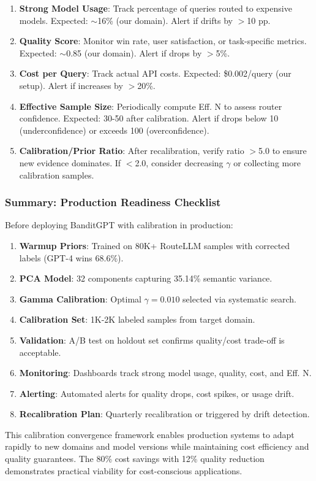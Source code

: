 \begin{enumerate}
    \item \textbf{Strong Model Usage}: Track percentage of queries routed to expensive models. Expected: $\sim$16\% (our domain). Alert if drifts by $>$10 pp.
    
    \item \textbf{Quality Score}: Monitor win rate, user satisfaction, or task-specific metrics. Expected: $\sim$0.85 (our domain). Alert if drops by $>$5\%.
    
    \item \textbf{Cost per Query}: Track actual API costs. Expected: \$0.002/query (our setup). Alert if increases by $>$20\%.
    
    \item \textbf{Effective Sample Size}: Periodically compute Eff. N to assess router confidence. Expected: 30-50 after calibration. Alert if drops below 10 (underconfidence) or exceeds 100 (overconfidence).
    
    \item \textbf{Calibration/Prior Ratio}: After recalibration, verify ratio $>$5.0 to ensure new evidence dominates. If $<$2.0, consider decreasing $\gamma$ or collecting more calibration samples.
\end{enumerate}

\subsubsection{Summary: Production Readiness Checklist}

Before deploying BanditGPT with calibration in production:

\begin{enumerate}
    \item \checkmark \textbf{Warmup Priors}: Trained on 80K+ RouteLLM samples with corrected labels (GPT-4 wins 68.6\%).
    \item \checkmark \textbf{PCA Model}: 32 components capturing 35.14\% semantic variance.
    \item \checkmark \textbf{Gamma Calibration}: Optimal $\gamma=0.010$ selected via systematic search.
    \item \checkmark \textbf{Calibration Set}: 1K-2K labeled samples from target domain.
    \item \checkmark \textbf{Validation}: A/B test on holdout set confirms quality/cost trade-off is acceptable.
    \item \checkmark \textbf{Monitoring}: Dashboards track strong model usage, quality, cost, and Eff. N.
    \item \checkmark \textbf{Alerting}: Automated alerts for quality drops, cost spikes, or usage drift.
    \item \checkmark \textbf{Recalibration Plan}: Quarterly recalibration or triggered by drift detection.
\end{enumerate}

This calibration convergence framework enables production systems to adapt rapidly to new domains and model versions while maintaining cost efficiency and quality guarantees. The 80\% cost savings with 12\% quality reduction demonstrates practical viability for cost-conscious applications.

